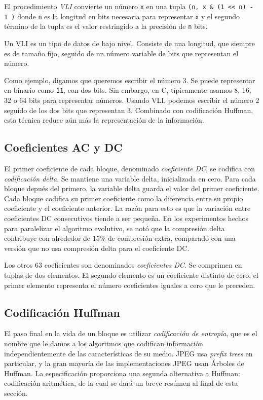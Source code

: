 El procedimiento \emph{VLI} convierte un número \verb+x+ en una tupla \verb+(n, x & (1 << n) - 1 )+
donde \verb+n+ es la longitud en bits necesaria para
representar \verb+x+ y el segundo término de la tupla es el valor restringido a
la precisión de \verb+n+ bits.

Un VLI es un tipo de datos de bajo nivel. Consiste de una longitud, que siempre
es de tamaño fijo, seguido de un número variable de bits que representan el
número.

Como ejemplo, digamos que queremos escribir el número 3. Se puede representar
en binario como \verb+11+, con dos bits. Sin embargo, en C, típicamente usamos
8, 16, 32 o 64 bits para representar números. Usando VLI, podemos escribir el
número 2 seguido de los dos bits que representan 3. Combinado con codificación
Huffman, esta técnica reduce aún más la representación de la información.

\subsection{Coeficientes AC y DC}\label{sub:acdc}

El primer coeficiente de cada bloque, denominado \emph{coeficiente DC}, se codifica con \emph{codificación delta}. Se mantiene una variable delta, inicializada en cero. Para cada bloque depués del primero, la variable delta guarda el valor del primer coeficiente. Cada bloque codifica su primer coeficiente como la diferencia entre su propio coeficiente y el coeficiente anterior. La razón para esto es que la variación entre coeficientes DC consecutivos tiende a ser pequeña. En los experimentos hechos para paralelizar el algoritmo evolutivo, se notó que la compresión delta contribuye con alrededor de $15\%$ de compresión extra, comparado con una versión que no usa compresión delta para el coeficiente DC.

Los otros 63 coeficientes son denominados \emph{coeficientes DC}. Se comprimen en tuplas de dos elementos. El segundo elemento es un coeficiente distinto de cero, el primer elemento representa el número coeficientes iguales a cero que le preceden.


\subsection{Codificación Huffman}\label{sub:huffman}

El paso final en la vida de un bloque es utilizar \emph{codificación de
entropía}, que es el nombre que le damos a los algoritmos que codifican
información independientemente de las características de su medio. JPEG usa
\emph{prefix trees} en particular, y la gran mayoría de las implementaciones
JPEG usan Árboles de Huffman. La especificación proporciona una segunda
alternativa a Huffman: codificación aritmética, de la cual se dará un breve
resúmen al final de esta sección.

